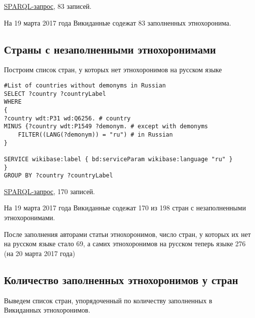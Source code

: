 \href{https://query.wikidata.org/#%23List%20of%20demonyms%20in%20Russian%0ASELECT%20%3Fcountry%20%3FcountryLabel%20%3Fdemonym%0AWHERE%0A%7B%0A%09%3Fcountry%20wdt%3AP31%20wd%3AQ6256.%20%20%20%20%20%20%23country%0A%09%3Fcountry%20wdt%3AP1549%20%3Fdemonym%20.%20%20%20%23demonym%0A%09FILTER%28%28LANG%28%3Fdemonym%29%29%20%3D%20%22ru%22%29%0A%09SERVICE%20wikibase%3Alabel%20%7B%20bd%3AserviceParam%20wikibase%3Alanguage%20%22ru%22%20%7D%0A%7D}{SPARQL-запрос}, 83 записей.

На 19 марта 2017 года Викиданные содежат 83 заполненных этнохоронима.

\subsection{Страны с незаполненными этнохоронимами}

Построим список стран, у которых нет этнохоронимов на русском языке

\begin{lstlisting}[language=SPARQL]
#List of countries without demonyms in Russian
SELECT ?country ?countryLabel 
WHERE
{
?country wdt:P31 wd:Q6256. # country
MINUS {?country wdt:P1549 ?demonym. # except with demonyms
    FILTER((LANG(?demonym)) = "ru") # in Russian
} 

SERVICE wikibase:label { bd:serviceParam wikibase:language "ru" }
}
GROUP BY ?country ?countryLabel
\end{lstlisting}

\href{https://query.wikidata.org/#%23List%20of%20countries%20without%20demonyms%20in%20Russian%0ASELECT%20%3Fcountry%20%3FcountryLabel%20%0AWHERE%0A%7B%0A%09%3Fcountry%20wdt%3AP31%20wd%3AQ6256.%20%20%20%20%20%20%20%20%20%20%20%20%20%20%23%20country%0A%09MINUS%20%7B%20%3Fcountry%20wdt%3AP1549%20%3Fdemonym.%20%20%20%20%23%20except%20with%20demonyms%0A%20%20%20%20%20%20%20%20%20%20%20%20FILTER%28%28LANG%28%3Fdemonym%29%29%20%3D%20%22ru%22%29%20%23%20in%20Russian%0A%20%20%20%20%20%20%20%20%20%20%7D%20%20%20%20%0A%20%20%20%20%0A%09SERVICE%20wikibase%3Alabel%20%7B%20bd%3AserviceParam%20wikibase%3Alanguage%20%22ru%22%20%7D%0A%7D%0AGROUP%20BY%20%3Fcountry%20%3FcountryLabel}{SPARQL-запрос}, 170 записей. 

На 19 марта 2017 года Викиданные содежат 170 из 198 стран с незаполненными этнохоронимами.

После заполнения авторами статьи этнохоронимов, число стран, у которых их нет на русском языке стало 69, а самих этнохоронимов на русском теперь языке 276 (на 20 марта 2017 года)

\subsection{Количество заполненных этнохоронимов у стран}

Выведем список стран, упорядоченный по количеству заполненных в Викиданных этнохоронимов.


